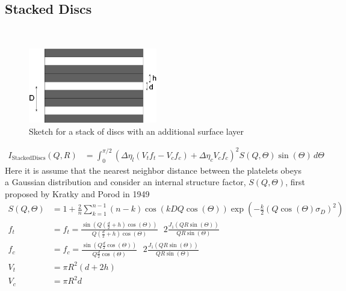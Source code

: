 



\clearpage
\subsection{Stacked Discs \cite{Kratky194935,Hanley2003}}
\label{sect:StackedDiscs}
~\\

\begin{figure}[htb]
\begin{center}
\includegraphics[width=0.5\textwidth,height=0.2908\textwidth]{../images/form_factor/cluster/stackdiscs.png}
\end{center}
\caption{Sketch for a stack of discs with an additional surface layer}
\label{stackeddiscs}
\end{figure}



\begin{align}
I_\text{StackedDiscs}(Q,R)&= \int_0^{\pi/2}\left( \Delta\eta_l
\left(V_t f_t - V_c f_c\right) + \Delta\eta_c  V_c f_c \right)^2
S(Q,\Theta) \sin(\Theta)\, d\Theta
\end{align}
Here it is assume that the nearest neighbor distance between the
platelets obeys a Gaussian distribution and consider an internal
structure factor, $S(Q,\Theta)$, first proposed by Kratky and Porod
in 1949 \cite{Kratky194935}
\begin{align}
S(Q,\Theta) &=  1+\frac{2}{n} \sum_{k=1}^{n-1} (n-k)
\cos(kDQ\cos(\Theta))
     \exp\left(-\frac{k}{2}\left(Q\cos(\Theta) \sigma_D\right)^2\right) \\
f_t &= f_t = \frac{\sin\left(Q(\frac{d}{2}+h)\cos(\Theta)\right)}{Q(\frac{d}{2}+h)\cos(\Theta)} \,\,\,\,2\frac{J_1(QR\sin(\Theta))}{QR\sin(\Theta)} \\
f_c &= f_c = \frac{\sin\left(Q\frac{d}{2}\cos(\Theta)\right)}{Q\frac{d}{2}\cos(\Theta)} \,\,\,\,2\frac{J_1(QR\sin(\Theta))}{QR\sin(\Theta)}\\
V_t &= \pi R^2 (d+2h)\\
V_c &= \pi R^2 d
\end{align}



